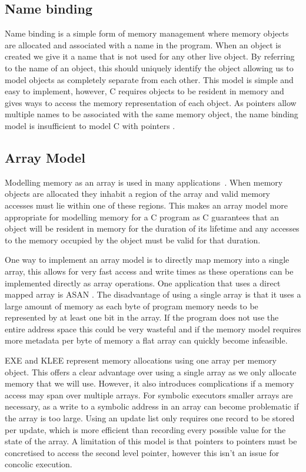 \documentclass[12pt,twoside]{report}
\begin{document}
\subsection{Name binding}
Name binding is a simple form of memory management where memory objects are allocated and associated with a name in the program. When an object is created we give it a name that is not used for any other live object. By referring to the name of an object, this should uniquely identify the object allowing us to model objects as completely separate from each other. This model is simple and easy to implement, however, C requires objects to be resident in memory and gives ways to access the memory representation of each object. As pointers allow multiple names to be associated with the same memory object, the name binding model is insufficient to model C with pointers \cite{xu2010memory}.

\subsection{Array Model}
Modelling memory as an array is used in many applications~\cite{cadar2008klee,cadar2008exe,leroy2008formal,poeplau2020symbolic}. When memory objects are allocated they inhabit a region of the array and valid memory accesses must lie within one of these regions. This makes an array model more appropriate for modelling memory for a C program as C guarantees that an object will be resident in memory for the duration of its lifetime and any accesses to the memory occupied by the object must be valid for that duration.

One way to implement an array model is to directly map memory into a single array, this allows for very fast access and write times as these operations can be implemented directly as array operations. One application that uses a direct mapped array is ASAN \cite{180957}. The disadvantage of using a single array is that it uses a large amount of memory as each byte of program memory needs to be represented by at least one bit in the array. If the program does not use the entire address space this could be very wasteful and if the memory model requires more metadata per byte of memory a flat array can quickly become infeasible.

EXE \cite{cadar2008exe} and KLEE \cite{cadar2008klee} represent memory allocations using one array per memory object. This offers a clear advantage over using a single array as we only allocate memory that we will use. However, it also introduces complications if a memory access may span over multiple arrays. For symbolic executors smaller arrays are necessary, as a write to a symbolic address in an array can become problematic if the array is too large. Using an update list only requires one record to be stored per update, which is more efficient than recording every possible value for the state of the array. A limitation of this model is that pointers to pointers must be concretised to access the second level pointer, however this isn't an issue for concolic execution.
\end{document}
